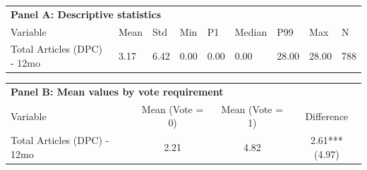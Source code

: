 \begin{table}[H]
\centering
\begin{tabular*}{\textwidth}{@{\extracolsep{\fill}}lllllllll}
\multicolumn{9}{l}{\textbf{Panel A: Descriptive statistics}}\\

\addlinespace
  \toprule
Variable & Mean & Std & Min & P1 & Median & P99 & Max & N \\ 
  \hline
Total Articles (DPC) - 12mo & 3.17 & 6.42 & 0.00 & 0.00 & 0.00 & 28.00 & 28.00 & 788 \\ 
   \hline
\end{tabular*}
\end{table}

\vspace{-0.75em}
\begin{table}[H]
\centering
\begin{tabular*}{\textwidth}{@{\extracolsep{\fill}}lccc}
\multicolumn{4}{l}{\textbf{Panel B: Mean values by vote requirement}}\\

\addlinespace
  \toprule
Variable & Mean (Vote = 0) & Mean (Vote = 1) & Difference \\ 
  \hline
Total Articles (DPC) - 12mo & 2.21 & 4.82 & 2.61*** (4.97) \\ 
   \hline
\end{tabular*}
\end{table}

